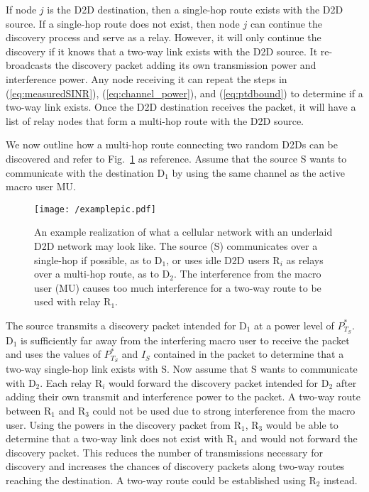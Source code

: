 \documentclass[10pt, final, journal, letterpaper,oneside, twocolumn]{IEEEtran}
\begin{document}
If node $j$ is the D2D destination, then a single-hop route exists with the D2D source.  If a single-hop route does not exist, then node $j$ can continue the discovery process and serve as a relay.  However, it will only continue the discovery if it knows that a two-way link exists with the D2D source.  It re-broadcasts the discovery packet adding its own transmission power and interference power.  Any node receiving it can repeat the steps in (\ref{eq:measuredSINR}), (\ref{eq:channel_power}), and (\ref{eq:ptdbound}) to determine if a two-way link exists.  Once the D2D destination receives the packet, it will have a list of relay nodes that form a multi-hop route with the D2D source.  

We now outline how a multi-hop route connecting two random D2Ds can be discovered and refer to Fig.~\ref{fig:example} as reference.  Assume that the source S wants to communicate with the destination D$_1$ by using the same channel as the active macro user MU.
\begin{figure}[htp]
\center
 \texttt{[image: /examplepic.pdf]}
 \caption[]{An example realization of what a cellular network with an underlaid D2D network may look like.  The source (S) communicates over a single-hop if possible, as to D$_1$, or uses idle D2D users R$_{i}$ as relays over a multi-hop route, as to D$_2$.  The interference from the macro user (MU) causes too much interference for a two-way route to be used with relay R$_1$. } 
  \label{fig:example}
\end{figure}
The source transmits a discovery packet intended for D$_1$ at a power level of $P_{T_{S}}^{*}$.  D$_1$ is sufficiently far away from the interfering macro user to receive the packet and uses the values of $P_{T_{S}}^{*}$ and $I_S$ contained in the packet to determine that a two-way single-hop link exists with S.  Now assume that S wants to communicate with D$_2$.  Each relay R$_i$ would forward the discovery packet intended for D$_2$ after adding their own transmit and interference power to the packet.  A two-way route between R$_1$ and R$_3$ could not be used due to strong interference from the macro user.  Using the powers in the discovery packet from R$_1$, R$_3$ would be able to determine that a two-way link does not exist with R$_1$ and would not forward the discovery packet.  This reduces the number of transmissions necessary for discovery and increases the chances of discovery packets along two-way routes reaching the destination.  A two-way route could be established using R$_2$ instead.  
\end{document}
